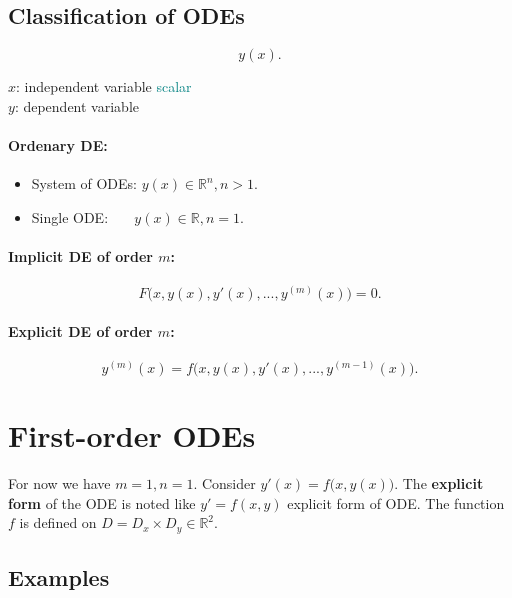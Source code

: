 \documentclass[]{article}
\begin{document}
	\subsection{Classification of ODEs}
	\[
	y(x)
	.\]
	\begin{multicols}{2}
	$x$: independent variable \textcolor{teal}{scalar}\\
	$y$: dependent variable
	\end{multicols}
	\paragraph{Ordenary DE:}
	\begin{itemize}
		\item System of ODEs:
			$
			y(x)\in\mathbb R ^{n},n>1
			.$
		\item Single ODE:
			$ ~~~~~~~
			y(x) \in\mathbb R,n=1
			.$
	\end{itemize}
	\paragraph{Implicit DE of order $m$:} 
	\[
	F\big(x,y(x),y'(x),...,y ^{(m)}(x)\big) = 0
	.\]
	\paragraph{Explicit DE of order $m$:}  
	\[
	y ^{(m)}(x)=f\big(x,y(x),y'(x),...,y ^{(m-1)}(x)\big)
	.\]
	
\section{First-order ODEs}
For now we have $ m=1,n=1 $. Consider $y'(x)=f\big(x,y(x)\big)$. The \textbf{explicit form} of the ODE is noted like $ y'=f(x,y) $ explicit form of ODE. The function $ f $ is defined on $D=D_x\times D_y\in\mathbb R ^{2}$.
\subsection{Examples}
\end{document}
